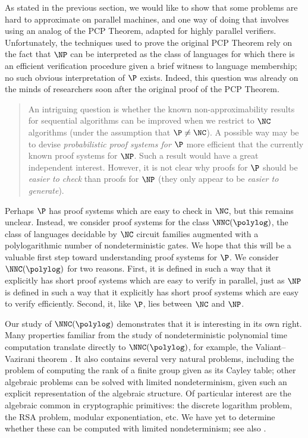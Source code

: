 \documentclass{article}
\begin{document}


As stated in the previous section, we would like to show that some problems are hard to approximate on parallel machines, and one way of doing that involves using an analog of the PCP Theorem, adapted for highly parallel verifiers.
Unfortunately, the techniques used to prove the original PCP Theorem rely on the fact that $\NP$ can be interpreted as the class of languages for which there is an efficient verification procedure given a brief witness to language membership; no such obvious interpretation of $\P$ exists.
Indeed, this question was already on the minds of researchers soon after the original proof of the PCP Theorem.
\blockquote[{\autocite{trevisan98}}]{
  An intriguing question is whether the known non-approximability results for sequential algorithms can be improved when we restrict to $\NC$ algorithms (under the assumption that $\P \neq \NC$).
  A possible way may be to devise \emph{probabilistic proof systems for $\P$} more efficient that the currently known proof systems for $\NP$.
  Such a result would have a great independent interest.
  However, it is not clear why proofs for $\P$ should be \emph{easier to check} than proofs for $\NP$ (they only appear to be \emph{easier to generate}).
}
Perhaps $\P$ has proof systems which are easy to check in $\NC$, but this remains unclear.
Instead, we consider proof systems for the class $\NNC(\polylog)$, the class of languages decidable by $\NC$ circuit families augmented with a polylogarithmic number of nondeterministic gates.
We hope that this will be a valuable first step toward understanding proof systems for $\P$.
We consider $\NNC(\polylog)$ for two reasons.
First, it is defined in such a way that it explicitly has short proof systems which are easy to verify in parallel, just as $\NP$ is defined in such a way that it explicitly has short proof systems which are easy to verify efficiently.
Second, it, like $\P$, lies between $\NC$ and $\NP$.

Our study of $\NNC(\polylog)$ demonstrates that it is interesting in its own right.
Many properties familiar from the study of nondeterministic polynomial time computation translate directly to $\NNC(\polylog)$, for example, the Valiant--Vazirani theorem \autocite{vv}.
It also contains several very natural problems, including the problem of computing the rank of a finite group given as its Cayley table; other algebraic problems can be solved with limited nondeterminism, given such an explicit representation of the algebraic structure.
Of particular interest are the algebraic common in cryptographic primitives: the discrete logarithm problem, the RSA problem, modular exponentiation, etc.
We have yet to determine whether these can be computed with limited nondeterminism; see also \autocite{timelock}.
\end{document}
